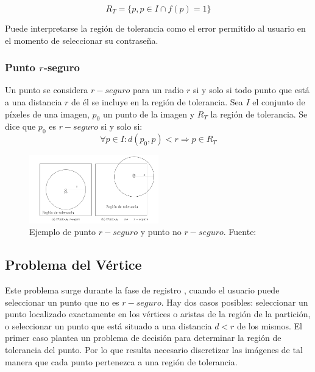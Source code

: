 \begin{equation}
	R_T = \{p, p \in I \cap f(p) = 1\} \label{eq:region_tolerancia}
\end{equation}

Puede interpretarse la región de tolerancia como el error permitido al usuario en el momento de seleccionar su contraseña.

\subsubsection{Punto \texorpdfstring{$r$}{r}-seguro}
Un punto se considera $r-seguro$ \cite{legon2019nuevo,  borrego2018debilidades} para un radio \(r\) si y solo si todo punto que está a una distancia \(r\) de él se incluye en la región de tolerancia. Sea \(I\) el conjunto de píxeles de una imagen, \(p_0\) un punto de la imagen y \(R_T\) la región de tolerancia. Se dice que \(p_0\) es $r-seguro$ si y solo si:
\begin{equation}
	\forall p \in I: d(p_0, p) < r \Rightarrow p \in R_T \label{eq:r_seguro}
\end{equation}
		
\begin{figure}[h]
			\centering
			\includegraphics[width=0.5\textwidth]{punto-r-seguro.png}			
			\caption{Ejemplo de punto $r-seguro$ y punto no $r-seguro$. Fuente: \cite{legon2019nuevo} }
		\end{figure}
		
	
\subsection{Problema del Vértice}
Este problema surge durante la fase de registro \cite{legon2019nuevo, birget2006graphical, borrego2018debilidades}, cuando el usuario puede seleccionar un punto que no es $r-seguro$. Hay dos casos posibles: seleccionar un punto localizado exactamente en los vértices o aristas de la región de la partición, o seleccionar un punto que está situado a una distancia \(d < r\) de los mismos. El primer caso plantea un problema de decisión para determinar la región de tolerancia del punto. Por lo que resulta necesario discretizar las imágenes de tal manera que cada punto pertenezca a una región de tolerancia.
	

